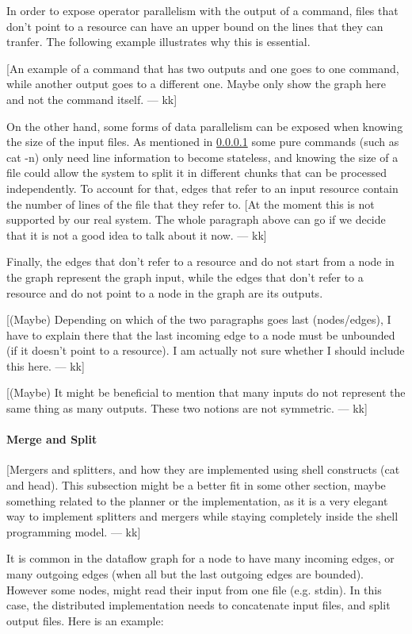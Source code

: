 \documentclass[sigplan,10pt,review,anonymous]{acmart}
\newcommand{\kk}[1]{[{\color{magenta}#1 --- kk}]}
\begin{document}
In order to expose operator parallelism with the output of a command,
files that don't point to a resource can have an upper bound on the
lines that they can tranfer. The following example illustrates why
this is essential.

\kk{An example of a command that has two outputs and one goes to one
  command, while another output goes to a different one. Maybe only
  show the graph here and not the command itself.}

On the other hand, some forms of data parallelism can be exposed when
knowing the size of the input files. As mentioned in \ref{} some pure
commands (such as cat -n) only need line information to become
stateless, and knowing the size of a file could allow the system to
split it in different chunks that can be processed independently. To
account for that, edges that refer to an input resource contain the
number of lines of the file that they refer to. \kk{At the moment this
  is not supported by our real system. The whole paragraph above can
  go if we decide that it is not a good idea to talk about it now.}

Finally, the edges that don't refer to a resource and do not start
from a node in the graph represent the graph input, while the edges
that don't refer to a resource and do not point to a node in the graph
are its outputs.

\kk{(Maybe) Depending on which of the two paragraphs goes last
  (nodes/edges), I have to explain there that the last incoming edge
  to a node must be unbounded (if it doesn't point to a resource). I
  am actually not sure whether I should include this here.}


\kk{(Maybe) It might be beneficial to mention that many inputs do not
  represent the same thing as many outputs. These two notions are not
  symmetric.}

\paragraph{Merge and Split}

\kk{Mergers and splitters, and how they are implemented using shell
  constructs (cat and head). This subsection might be a better fit in
  some other section, maybe something related to the planner or the
  implementation, as it is a very elegant way to implement splitters
  and mergers while staying completely inside the shell programming
  model.}

It is common in the dataflow graph for a node to have many incoming
edges, or many outgoing edges (when all but the last outgoing edges
are bounded). However some nodes, might read their input from one file
(e.g. stdin). In this case, the distributed implementation needs to
concatenate input files, and split output files. Here is an example:
\end{document}

